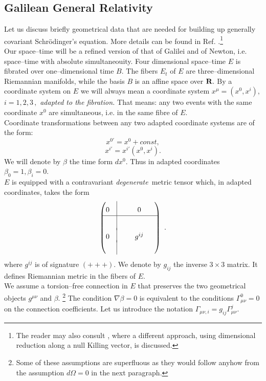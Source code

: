 \documentclass[12pt]{article}
\begin{document}
\subsection{Galilean General Relativity}
Let us discuss briefly geometrical data that are needed for building up
generally covariant Schr\"odinger's equation.  More details can be
found in Ref. \cite{jamo}.\footnote{The reader may also consult \cite{duv}, 
where a different approach,  using dimensional reduction along a
null Killing vector,  is discussed.  }\\
Our space--time will be a refined version of that of Galilei and
of Newton,  i.e.  space--time with absolute simultaneouity. 
Four dimensional space--time $E$ is fibrated over one--dimensional
time $B . $ The fibers $E_t$ of $E$ are three--dimensional
Riemannian manifolds,  while the basis $B$ is an affine space over
${\bf R} . $ By a coordinate system on $E$ we will always mean a
coordinate system $x^\mu= (x^0, x^i) , $ $i=1, 2, 3\,  , $ {\sl adapted
to the
fibration.}  That means: any two events with the same coordinate $x^0$ are
simultaneous,  i.e.  in the same fibre of $E . $\\
Coordinate transformations between any two adapted coordinate systems
are of the form: 
$$
x^{0'}=x^0+const , 
$$
$$
x^{i'}=x^{i'}\left (x^0, x^{i}\right) . 
$$
We will denote by $\beta$ the time form $dx^0 . $ Thus in adapted
coordinates $\beta_0=1, \beta_i=0$. \\
$E$ is equipped with a contravariant {\sl degenerate}\, metric tensor which,
in adapted coordinates, takes the form
\def\linie{\vrule height 15pt depth 5pt}
\def\back{\noalign{\vskip-3pt}}
$$\begin{pmatrix}0 &\linie & \phantom{0 }& 0 &\phantom{0}\cr
\noalign{\hrule}
&\linie && \cr\back
0 &\linie &  & g^{ij} & 
\cr\back
& \linie && 
\end{pmatrix} \ . $$
where $g^{ij}$ is of signature $ (+++) . $ We denote by $g_{ij}$ the
inverse $3\times 3$ matrix.  It defines Riemannian metric in the
fibers of $E . $\\
We assume a torsion--free connection in $E$ that preserves
the two geometrical objects $g^{\mu\nu}$ and $\beta$.
\footnote{Some of these assumptions are superfluous
as they would
follow anyhow from the assumption $d\Omega=0$ in the next
paragraph. }
The condition $\nabla\beta =0$ is equivalent to the conditions 
$\Gamma^0_{\mu\nu}=0$ on the connection coefficients.  Let us
introduce the notation $\Gamma_{\mu\nu, i}=g_{ij}\Gamma^j_{\mu\nu}. $
\end{document}
